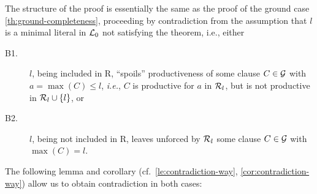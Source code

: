\begin{PROOF} 
The structure of the proof is essentially the same as the proof of the ground case
\ref{th:ground-completeness}, proceeding 
by contradiction from the assumption that $l$ is a minimal literal 
in \(\mbox {$\cal L$}_0\) not satisfying the theorem, i.e., either
\begin{description}%
\item[B1.] $l$, being included in \C R, ``spoils'' productiveness of some 
  clause \(C\in\mbox {$\cal G$}\) with \(a=\max (C) \leq l\), {\em i.e.}, $C$ is
  productive for $a$ in \(\mbox {$\cal R$}_l\), but is not productive in \(\mbox {$\cal R$}_l\cup\{l\}\), or
\item[B2.] $l$, being not included in \C R, leaves unforced by \(\mbox {$\cal R$}_l\) 
  some clause \(C\in\mbox {$\cal G$}\) with \(\max (C)=l\).
\end{description}
The following lemma and corollary (cf.~\ref{le:contradiction-way}, \ref{cor:contradiction-way}) allow us to obtain contradiction in both cases:


\end{PROOF}

